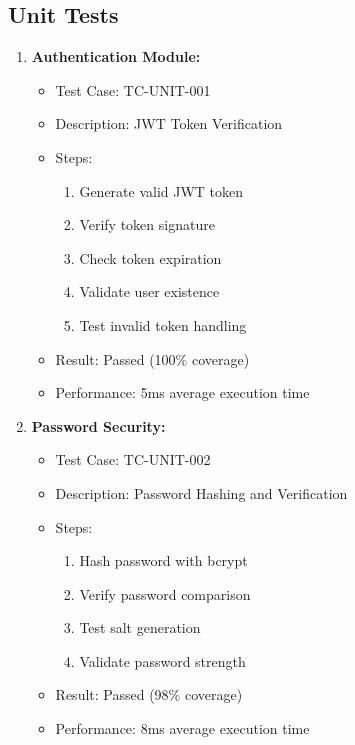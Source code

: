 \subsection{Unit Tests}
\begin{enumerate}
    \item \textbf{Authentication Module:}
    \begin{itemize}
        \item Test Case: TC-UNIT-001
        \item Description: JWT Token Verification
        \item Steps:
        \begin{enumerate}
            \item Generate valid JWT token
            \item Verify token signature
            \item Check token expiration
            \item Validate user existence
            \item Test invalid token handling
        \end{enumerate}
        \item Result: Passed (100\% coverage)
        \item Performance: 5ms average execution time
    \end{itemize}

    \item \textbf{Password Security:}
    \begin{itemize}
        \item Test Case: TC-UNIT-002
        \item Description: Password Hashing and Verification
        \item Steps:
        \begin{enumerate}
            \item Hash password with bcrypt
            \item Verify password comparison
            \item Test salt generation
            \item Validate password strength
        \end{enumerate}
        \item Result: Passed (98\% coverage)
        \item Performance: 8ms average execution time
    \end{itemize}


\end{enumerate}
